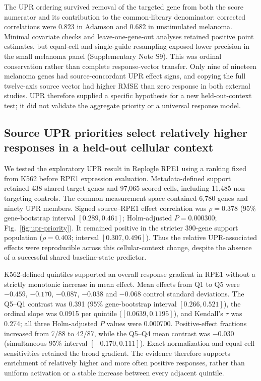 \documentclass[a4paper,fleqn]{cas-sc}
\makeatletter
\DeclareRobustCommand{\rev}[1]{{\color{red}\def\@citecolor{black}\def\@linkcolor{red}\def\@urlcolor{red}#1}}
\makeatother
\begin{document}
\rev{The UPR ordering survived removal of the targeted gene from both the score numerator and its contribution to the common-library denominator: corrected correlations were 0.823 in Adamson and 0.682 in unstimulated melanoma.} \rev{Minimal covariate checks and leave-one-gene-out analyses retained positive point estimates, but equal-cell and single-guide resampling exposed lower precision in the small melanoma panel (Supplementary Note S9).} \rev{This was ordinal conservation rather than complete response-vector transfer.} \rev{Only nine of nineteen melanoma genes had source-concordant UPR effect signs, and copying the full twelve-axis source vector had higher RMSE than zero response in both external studies.} \rev{UPR therefore supplied a specific hypothesis for a new held-out-context test; it did not validate the aggregate priority or a universal response model.}

\FloatBarrier

\subsection{\rev{Source UPR priorities select relatively higher responses in a held-out cellular context}}

\rev{We tested the exploratory UPR result in Replogle RPE1 using a ranking fixed from K562 before RPE1 expression evaluation.} \rev{Metadata-defined support retained 438 shared target genes and 97,065 scored cells, including 11,485 non-targeting controls.} \rev{The common measurement space contained 6,780 genes and ninety UPR members.} \rev{Signed source--RPE1 effect correlation was $\rho=0.378$ ($95\%$ gene-bootstrap interval $[0.289,0.461]$; Holm-adjusted $P=0.000300$; Fig.~\ref{fig:upr-priority}).} \rev{It remained positive in the stricter 390-gene support population ($\rho=0.403$; interval $[0.307,0.496]$).} \rev{Thus the relative UPR-associated effects were reproducible across this cellular-context change, despite the absence of a successful shared baseline-state predictor.}

\rev{K562-defined quintiles supported an overall response gradient in RPE1 without a strictly monotonic increase in mean effect.} \rev{Mean effects from Q1 to Q5 were $-0.459$, $-0.170$, $-0.087$, $-0.038$ and $-0.068$ control standard deviations.} \rev{The Q5--Q1 contrast was 0.391 ($95\%$ gene-bootstrap interval $[0.266,0.521]$), the ordinal slope was 0.0915 per quintile ($[0.0639,0.1195]$), and Kendall's $\tau$ was 0.274; all three Holm-adjusted $P$ values were 0.000700.} \rev{Positive-effect fractions increased from 7/88 to 42/87, while the Q5--Q4 mean contrast was $-0.030$ (simultaneous $95\%$ interval $[-0.170,0.111]$).} \rev{Exact normalization and equal-cell sensitivities retained the broad gradient.} \rev{The evidence therefore supports enrichment of relatively higher and more often positive responses, rather than uniform activation or a stable increase between every adjacent quintile.}
\end{document}
